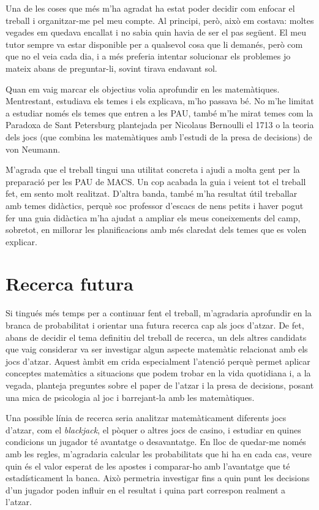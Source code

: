 Una de les coses que més m'ha agradat ha estat poder decidir com enfocar el treball i organitzar-me pel meu compte. Al principi, però, això em costava: moltes vegades em quedava encallat i no sabia quin havia de ser el pas següent. El meu tutor sempre va estar disponible per a qualsevol cosa que li demanés, però com que no el veia cada dia, i a més preferia intentar solucionar els problemes jo mateix abans de preguntar-li, sovint tirava endavant sol.

Quan em vaig marcar els objectius volia aprofundir en les matemàtiques. Mentrestant, estudiava els temes i els explicava, m'ho passava bé. No m'he limitat a estudiar només els temes que entren a les PAU, també m'he mirat temes com la Paradoxa de Sant Petersburg plantejada per Nicolaus Bernoulli el 1713 o la teoria dels jocs (que combina les matemàtiques amb l'estudi de la presa de decisions) de von Neumann.

M'agrada que el treball tingui una utilitat concreta i ajudi a molta gent per la preparació per les PAU de MACS. Un cop acabada la guia i veient tot el treball fet, em sento molt realitzat. D'altra banda, també m'ha resultat útil treballar amb temes didàctics, perquè soc professor d'escacs de nens petits i haver pogut fer una guia didàctica m'ha ajudat a ampliar els meus coneixements del camp, sobretot, en millorar les planificacions amb més claredat dels temes que es volen explicar.

\section{Recerca futura}
Si tingués més temps per a continuar fent el treball, m'agradaria aprofundir en la branca de probabilitat i orientar una futura recerca cap als jocs d'atzar. De fet, abans de decidir el tema definitiu del treball de recerca, un dels altres candidats que vaig considerar va ser investigar algun aspecte matemàtic relacionat amb els jocs d'atzar. Aquest àmbit em crida especialment l'atenció perquè permet aplicar conceptes matemàtics a situacions que podem trobar en la vida quotidiana i, a la vegada, planteja preguntes sobre el paper de l'atzar i la presa de decisions, posant una mica de psicologia al joc i barrejant-la amb les matemàtiques.

Una possible línia de recerca seria analitzar matemàticament diferents jocs d'atzar, com el \textit{blackjack}, el pòquer o altres jocs de casino, i estudiar en quines condicions un jugador té avantatge o desavantatge. En lloc de quedar-me només amb les regles, m’agradaria calcular les probabilitats que hi ha en cada cas, veure quin és el valor esperat de les apostes i comparar-ho amb l’avantatge que té estadísticament la banca. Això permetria investigar fins a quin punt les decisions d'un jugador poden influir en el resultat i quina part correspon realment a l'atzar.

